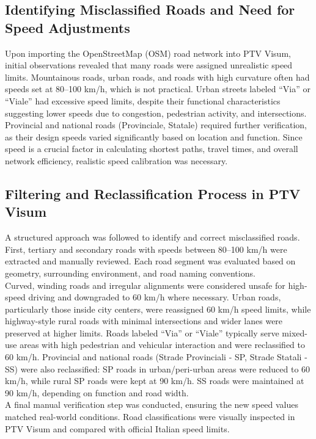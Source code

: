 \subsection{Identifying Misclassified Roads and Need for Speed Adjustments}
Upon importing the OpenStreetMap (OSM) road network into PTV Visum, initial observations revealed that many roads were assigned unrealistic speed limits. Mountainous roads, urban roads, and roads with high curvature often had speeds set at 80–100 km/h, which is not practical. Urban streets labeled “Via” or “Viale” had excessive speed limits, despite their functional characteristics suggesting lower speeds due to congestion, pedestrian activity, and intersections. Provincial and national roads (Provinciale, Statale) required further verification, as their design speeds varied significantly based on location and function. Since speed is a crucial factor in calculating shortest paths, travel times, and overall network efficiency, realistic speed calibration was necessary.

\subsection{Filtering and Reclassification Process in PTV Visum}
A structured approach was followed to identify and correct misclassified roads. First, tertiary and secondary roads with speeds between 80–100 km/h were extracted and manually reviewed. Each road segment was evaluated based on geometry, surrounding environment, and road naming conventions.\\
Curved, winding roads and irregular alignments were considered unsafe for high-speed driving and downgraded to 60 km/h where necessary. Urban roads, particularly those inside city centers, were reassigned 60 km/h speed limits, while highway-style rural roads with minimal intersections and wider lanes were preserved at higher limits. Roads labeled “Via” or “Viale” typically serve mixed-use areas with high pedestrian and vehicular interaction and were reclassified to 60 km/h. Provincial and national roads (Strade Provinciali - SP, Strade Statali - SS) were also reclassified: SP roads in urban/peri-urban areas were reduced to 60 km/h, while rural SP roads were kept at 90 km/h. SS roads were maintained at 90 km/h, depending on function and road width.\\
A final manual verification step was conducted, ensuring the new speed values matched real-world conditions. Road classifications were visually inspected in PTV Visum and compared with official Italian speed limits.

